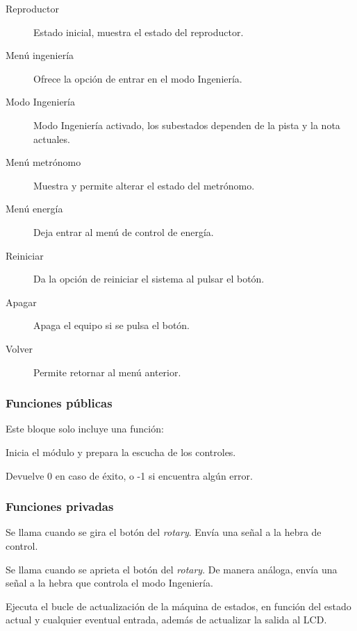\smallskip

\begin{description}
	\item[Reproductor] Estado inicial, muestra el estado del reproductor.
	\item[Menú ingeniería] Ofrece la opción de entrar en el modo Ingeniería.
	\item[Modo Ingeniería] Modo Ingeniería activado, los subestados dependen de la pista y la nota actuales.
	\item[Menú metrónomo] Muestra y permite alterar el estado del metrónomo.
	\item[Menú energía] Deja entrar al menú de control de energía.
	\item[Reiniciar] Da la opción de reiniciar el sistema al pulsar el botón.
	\item[Apagar] Apaga el equipo si se pulsa el botón.
	\item[Volver] Permite retornar al menú anterior.
\end{description}

\subsubsection{Funciones públicas}

Este bloque solo incluye una función:

\begin{description}[style=nextline]
	\item[periph\_init () : integer]
	Inicia el módulo y prepara la escucha de los controles.
	
	Devuelve 0 en caso de éxito, o -1 si encuentra algún error.
\end{description}

\subsubsection{Funciones privadas}

\begin{description}[style=nextline]
	\item[rot\_change ()]
	Se llama cuando se gira el botón del \textit{rotary}. Envía una señal a la hebra de control.
	
	\item[rot\_push ()]
	Se llama cuando se aprieta el botón del \textit{rotary}. De manera análoga, envía una señal a la hebra que controla el modo Ingeniería.
	
	\item[periph\_run ()]
	Ejecuta el bucle de actualización de la máquina de estados, en función del estado actual y cualquier eventual entrada, además de actualizar la salida al \acrshort{LCD}.
\end{description}

